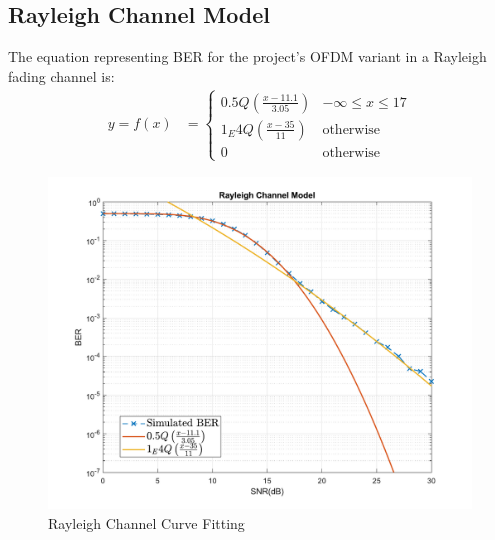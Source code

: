 \subsection{Rayleigh Channel Model}
The equation representing BER for the project's OFDM variant in a Rayleigh fading channel is:
\begin{align*}
	y = f(x) &=
	\begin{cases}
		0.5Q \left(\frac{x - 11.1}{3.05}\right) & -\infty \leq x \leq 17 \\
		1_E4Q \left(\frac{x - 35}{11}\right) & \text{otherwise} \\
		0 & \text{otherwise}
	\end{cases}
\end{align*}
\begin{figure}[htpb!]
    \centering
    \includegraphics[scale=0.6]{Graphics/Methodology/RaylCurveFit.pdf}
    \caption{Rayleigh Channel Curve Fitting}
	\label{fig:raylCurveFit}
\end{figure}
\pagebreak

